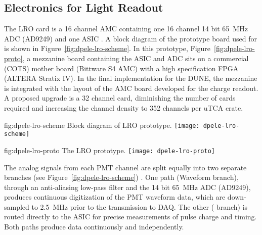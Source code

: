 \subsection{Electronics for Light Readout}
\label{sec:fddp-tpc-elec-design-lro}

%
The LRO card is a \num{16} channel AMC containing one \num{16} channel \num{14} bit \SI{65}{\MHz} ADC (AD9249) and one  ASIC \cite{Blin:2017}. A block diagram of the prototype board used for  is shown in Figure~\ref{fig:dpele-lro-scheme}. In this prototype, Figure~\ref{fig:dpele-lro-proto}, a mezzanine board containing the ASIC and ADC sits on a commercial (COTS) mother board (Bittware S4 AMC) with a high specification FPGA (ALTERA Stratix IV). In the final implementation for the DUNE, the mezzanine is integrated with the layout of the AMC board developed for the charge readout.  
A proposed upgrade is a \num{32} channel card, diminishing the number of cards required and increasing the channel density to \num{352} channels per uTCA crate.

\begin{dunefigure}{fig:dpele-lro-scheme}
{Block diagram of LRO prototype.}
\texttt{[image: dpele-lro-scheme]}
\end{dunefigure}

\begin{dunefigure}{fig:dpele-lro-proto}
{The LRO prototype.}
\texttt{[image: dpele-lro-proto]}
\end{dunefigure}

The analog signals from each PMT channel are split equally into two separate branches (see Figure~\ref{fig:dpele-lro-scheme}) . One path (Waveform branch), through an anti-aliasing low-pass filter and the \num{14} bit \SI{65}{\MHz} ADC (AD9249), produces continuous digitization of the PMT waveform data, which are down-sampled to \SI{2.5}{MHz} prior to the transmission to DAQ. The other ( branch) is routed directly to the  ASIC for precise measurements of pulse charge and timing. Both paths produce data continuously and independently.


